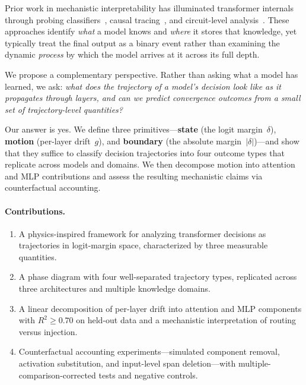 \documentclass{article}
\begin{document}
Prior work in mechanistic interpretability has illuminated transformer internals through probing classifiers~\cite{belinkov2022}, causal tracing~\cite{meng2022}, and circuit-level analysis~\cite{olsson2022,conmy2023}.
These approaches identify \emph{what} a model knows and \emph{where} it stores that knowledge, yet typically treat the final output as a binary event rather than examining the dynamic \emph{process} by which the model arrives at it across its full depth.

We propose a complementary perspective.  Rather than asking what a model has learned, we ask: \emph{what does the trajectory of a model's decision look like as it propagates through layers, and can we predict convergence outcomes from a small set of trajectory-level quantities?}

Our answer is yes.  We define three primitives---\textbf{state} (the logit margin~$\delta$), \textbf{motion} (per-layer drift~$g$), and \textbf{boundary} (the absolute margin~$|\delta|$)---and show that they suffice to classify decision trajectories into four outcome types that replicate across models and domains.  We then decompose motion into attention and MLP contributions and assess the resulting mechanistic claims via counterfactual accounting.

\paragraph{Contributions.}
\begin{enumerate}
\item A physics-inspired framework for analyzing transformer decisions as trajectories in logit-margin space, characterized by three measurable quantities.
\item A phase diagram with four well-separated trajectory types, replicated across three architectures and multiple knowledge domains.
\item A linear decomposition of per-layer drift into attention and MLP components with $R^2 \geq 0.70$ on held-out data and a mechanistic interpretation of routing versus injection.
\item Counterfactual accounting experiments---simulated component removal, activation substitution, and input-level span deletion---with multiple-comparison-corrected tests and negative controls.
\end{enumerate}


\end{document}
